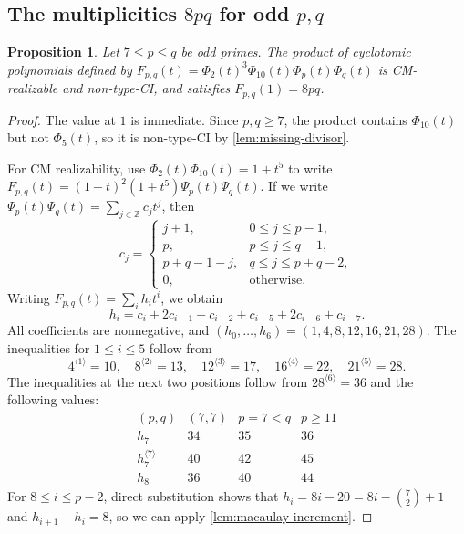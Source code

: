 \documentclass[11pt,a4paper]{amsart}
\newtheorem{proposition}[proposition]{Proposition}
\theoremstyle{definition}
\theoremstyle{remark}
\newcommand{\ZZ}{\mathbb Z}
\begin{document}
\subsection{The multiplicities \texorpdfstring{$8pq$}{8pq} for odd \texorpdfstring{$p,q$}{p,q}}
\begin{proposition}\label{prop:Fpq}
Let $7\le p\le q$ be odd primes. The product of cyclotomic polynomials defined by $F_{p,q}(t)=\Phi_2(t)^3\Phi_{10}(t)\Phi_p(t)\Phi_q(t)$ is CM-realizable and non-type-CI, and satisfies $F_{p,q}(1)=8pq$.
\end{proposition}
\begin{proof}
The value at $1$ is immediate. Since $p,q\ge7$, the product contains $\Phi_{10}(t)$ but not $\Phi_5(t)$, so it is non-type-CI by \cref{lem:missing-divisor}.

For CM realizability, use $\Phi_2(t)\Phi_{10}(t)=1+t^5$ to write $F_{p,q}(t)=(1+t)^2(1+t^5)\Psi_p(t)\Psi_q(t)$. If we write $\Psi_p(t)\Psi_q(t)=\sum_{j\in\ZZ}c_jt^j$, then
\[c_j=\begin{cases}j+1,&0\le j\le p-1,\\p,&p\le j\le q-1,\\p+q-1-j,&q\le j\le p+q-2,\\0,&\text{otherwise}.\end{cases}\]
Writing $F_{p,q}(t)=\sum_i h_it^i$, we obtain \[h_i=c_i+2c_{i-1}+c_{i-2}+c_{i-5}+2c_{i-6}+c_{i-7}.\]
All coefficients are nonnegative, and $(h_0,\ldots,h_6)=(1,4,8,12,16,21,28)$. The inequalities for $1\le i\le5$ follow from
\[4^{\langle1\rangle}=10,\quad8^{\langle2\rangle}=13,\quad12^{\langle3\rangle}=17,\quad16^{\langle4\rangle}=22,\quad21^{\langle5\rangle}=28.\]
The inequalities at the next two positions follow from $28^{\langle6\rangle}=36$ and the following values:
\[\begin{array}{c|ccc}
(p,q)&(7,7)&p=7<q&p\ge11\\\hline
h_7&34&35&36\\
h_7^{\langle7\rangle}&40&42&45\\
h_8&36&40&44
\end{array}\]
For $8\le i\le p-2$, direct substitution shows that $h_i=8i-20=8i-\binom{7}{2}+1$ and $h_{i+1}-h_i=8$, so we can apply \cref{lem:macaulay-increment}.


\end{proof}
\end{document}
